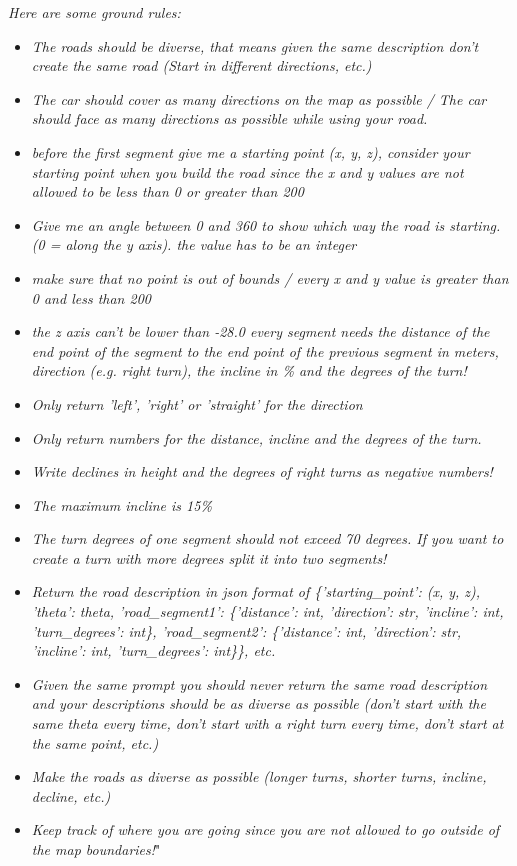 \textit{Here are some ground rules:}
\begin{itemize}
    \item \textit{The roads should be diverse, that means given the same description don't create the same road (Start in different directions, etc.) }
    \item \textit{The car should cover as many directions on the map as possible / The car should face as many directions as possible while using your road. }
    \item \textit{before the first segment give me a starting point (x, y, z), consider your starting point when you build the road since the x and y values are not allowed to be less than 0 or greater than 200 }
    \item \textit{Give me an angle between 0 and 360 to show which way the road is starting. (0 = along the y axis).  the value has to be an integer }
    \item \textit{make sure that no point is out of bounds / every x and y value is greater than 0 and less than 200}
    \item \textit{the z axis can't be lower than -28.0 
    every segment needs the distance of the end point of the segment to the end point of the previous segment in meters, direction (e.g. right turn), the incline in \% and the degrees of the turn! }
    \item \textit{Only return 'left', 'right' or 'straight' for the direction }
    \item \textit{Only return numbers for the distance, incline and the degrees of the turn.}
    \item \textit{Write declines in height and the degrees of right turns as negative numbers!}
    \item \textit{The maximum incline is 15\% }
    \item \textit{The turn degrees of one segment should not exceed 70 degrees. If you want to create a turn with more degrees split it into two segments!}
    \item \textit{Return the road description in json format of \{'starting\_point': (x, y, z), 'theta': theta, 'road\_segment1': \{'distance': int, 'direction': str, 'incline': int, 'turn\_degrees': int\}, 'road\_segment2': \{'distance': int, 'direction': str, 'incline': int, 'turn\_degrees': int\}\}, etc. }
    \item \textit{Given the same prompt you should never return the same road description and your descriptions should be as diverse as possible (don't start with the same theta every time, don't start with a right turn every time, don't start at the same point, etc.) }
    \item \textit{Make the roads as diverse as possible (longer turns, shorter turns, incline, decline, etc.) }
    \item \textit{Keep track of where you are going since you are not allowed to go outside of the map boundaries!}"
\end{itemize}

